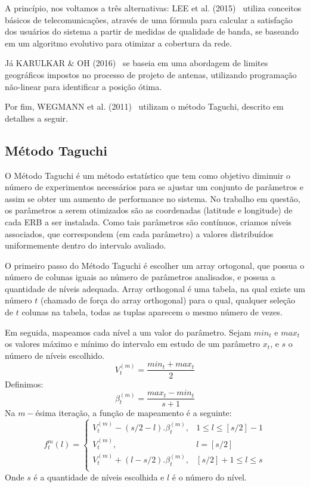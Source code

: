 \documentclass[]{politex}
\begin{document}
A princípio, nos voltamos a três alternativas: LEE et al. (2015)~
\cite{evolutivo} utiliza conceitos básicos de telecomunicações, através de uma
fórmula para calcular a satisfação dos usuários do sistema a partir de medidas
de qualidade de banda, se baseando em um algoritmo evolutivo para otimizar
a cobertura da rede.

Já KARULKAR \& OH (2016)~\cite{nao-linear} se baseia em uma abordagem de limites
geográficos impostos no processo de projeto de antenas, utilizando programação
não-linear para identificar a posição ótima.

Por fim, WEGMANN et al. (2011)~\cite{taguchi} utilizam o método Taguchi,
descrito em detalhes a seguir.

\subsection{Método Taguchi}
O Método Taguchi é um método estatístico que tem como objetivo diminuir o número
de experimentos necessários para se ajustar um conjunto de parâmetros e assim
se obter um aumento de performance no sistema. No trabalho em questão, os
parâmetros a serem otimizados são as coordenadas (latitude e longitude) de cada
ERB a ser instalada. Como tais parâmetros são contínuos, criamos níveis
associados, que correspondem (em cada parâmetro) a valores distribuídos
uniformemente dentro do intervalo avaliado.

O primeiro passo do Método Taguchi é escolher um array ortogonal, que possua o
número de colunas iguais ao número de parâmetros analisados, e possua a
quantidade de níveis adequada. Array orthogonal é uma tabela, na qual existe um
número $t$ (chamado de força do array orthogonal) para o qual, qualquer seleção de
$t$ colunas na tabela, todas as tuplas aparecem o mesmo número de vezes.

Em seguida, mapeamos cada nível a um valor do parâmetro. Sejam $min_t$ e $max_t$
os valores máximo e mínimo do intervalo em estudo de um parâmetro $x_t$, e $s$ o
número de níveis escolhido.
\begin{equation*}
    V_t^{(m)}=\frac{min_t+max_t}{2}
\end{equation*}
Definimos:
\begin{equation*}
    \beta_t^{(m)} = \frac{max_t-min_t}{s+1}
\end{equation*}
Na $m-$ésima iteração, a função de mapeamento é a seguinte:
\begin{equation*}
    f_t^m(l) =
    \begin{cases}
        V_t^{(m)} - (s/2 - l).\beta_t^{(m)}, & 1 \leq l \leq [s/2] - 1 \\
        V_t^{(m)}, &  l = [s/2]\\
        V_t^{(m)} + (l - s/2).\beta_t^{(m)}, & [s/2] + 1 \leq l \leq s \\
    \end{cases}
\end{equation*}
Onde $s$ é a quantidade de níveis escolhida e $l$ é o número do nível.
\end{document}
